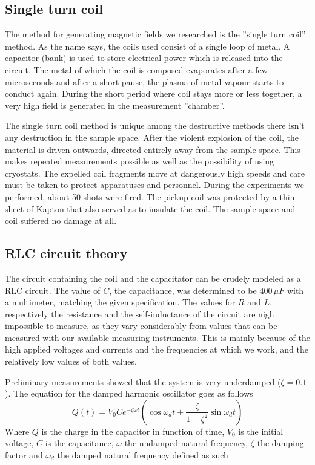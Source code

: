 \subsection{Single turn coil}

The method for generating magnetic fields we researched is the ''single turn 
coil'' method. As the name says, the coils used consist of a single loop of 
metal. A capacitor (bank) is used to store electrical power which is released 
into the circuit. The metal of which the coil is composed evaporates after a 
few microseconds and after a short pause, the plasma of metal vapour starts to 
conduct again. During the short period where coil stays more or less together, 
a very high field is generated in the measurement ''chamber''. 

The single turn coil method is unique among the destructive methods there isn't 
any destruction in the sample space. After the violent explosion of the coil, 
the material is driven outwards, directed entirely away from the sample space.  
This makes repeated measurements possible as well as the possibility of using 
cryostats. The expelled coil fragments move at dangerously high speeds and care 
must be taken to protect apparatuses and personnel. \cite{singleTurn} 
\cite{herlachArticle} During the experiments we performed, about 50 shots were 
fired. The pickup-coil was protected by a thin sheet of Kapton that also served 
as to insulate the coil. The sample space and coil suffered no damage at all.

\subsection{RLC circuit theory}

The circuit containing the coil and the capacitator can be crudely modeled as a 
RLC circuit. The value of $C$, the capacitance, was determined to be $400\,\mu 
F$ with a multimeter, matching the given specification. The values for $R$ and 
$L$, respectively the resistance and the self-inductance of the circuit are 
nigh impossible to measure, as they vary considerably from values that can be 
measured with our available measuring instruments. This is mainly because of 
the high applied voltages and currents and the frequencies at which we work, 
and the relatively low values of both values.

Preliminary measurements showed that the system is very underdamped ($\zeta = 
0.1$). The equation for the damped harmonic oscillator goes as follows 
\cite{serway}
\begin{equation}
Q(t) = V_0 C e^{-\zeta \omega t} \left( \cos{\omega_d t} + \frac{\zeta} 
{1-\zeta^2} \sin{\omega_d t}\right)
\end{equation}
Where $Q$ is the charge in the capacitor in function of time, $V_0$ is the 
initial voltage, $C$ is the capacitance, $\omega$ the undamped natural 
frequency, $\zeta$ the damping factor and $\omega_d$ the damped natural 
frequency defined as such

